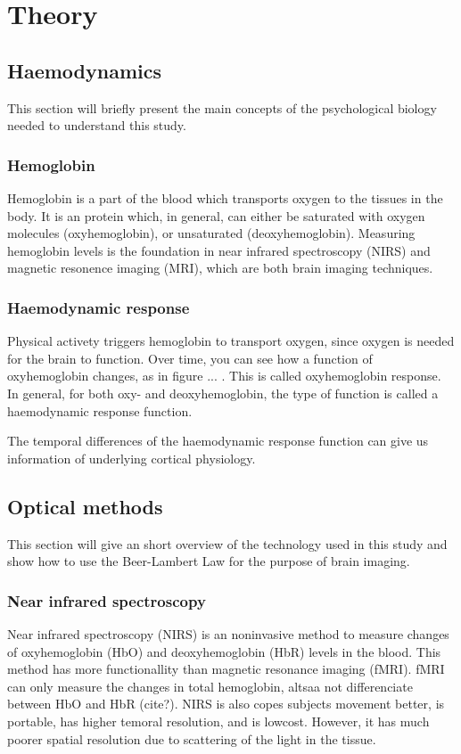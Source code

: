\section{Theory}

\subsection{Haemodynamics} \label{sec:haemodynamics}
This section will briefly present the main concepts of the psychological biology needed to understand this study.

\subsubsection{Hemoglobin}
Hemoglobin is a part of the blood which transports oxygen to the tissues in the body. It is an protein which, in general, can either be saturated with oxygen molecules (oxyhemoglobin), or unsaturated (deoxyhemoglobin). Measuring hemoglobin levels is the foundation in near infrared spectroscopy (NIRS) and magnetic resonence imaging (MRI), which are both brain imaging techniques\cite{Carter20101}.

\subsubsection{Haemodynamic response}
Physical activety triggers hemoglobin to transport oxygen, since oxygen is needed for the brain to function. Over time, you can see how a function of oxyhemoglobin changes, as in figure ... . This is called oxyhemoglobin response. In general, for both oxy- and deoxyhemoglobin, the type of function is called a haemodynamic response function. 

The temporal differences of the haemodynamic response function can give us information of underlying cortical physiology\cite{Haigh2015379}. 


\subsection{Optical methods} \label{sec:opticalMethods}
This section will give an short overview of the technology used in this study and show how to use the Beer-Lambert Law for the purpose of brain imaging.

\subsubsection{Near infrared spectroscopy} \label{sec:NIRS}
Near infrared spectroscopy (NIRS) is an noninvasive method to measure changes of oxyhemoglobin (HbO) and deoxyhemoglobin (HbR) levels in the blood\cite{villringer1993near}. This method has more functionallity than magnetic resonance imaging (fMRI)\cite{HomER}. fMRI can only measure the changes in total hemoglobin, altsaa not differenciate between HbO and HbR (cite?). NIRS is also copes subjects movement better, is portable, has higher temoral resolution, and is lowcost. However, it has much poorer spatial resolution due to scattering of the light in the tissue\cite{zhang2007imaging}.

